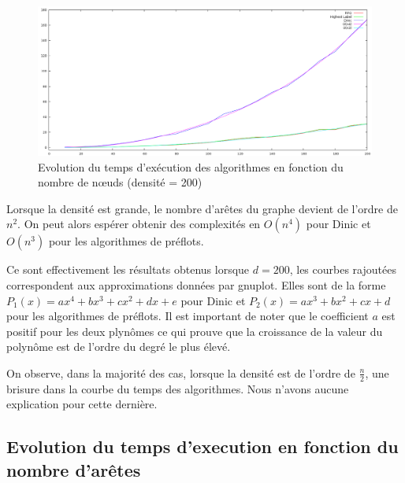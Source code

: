 \begin{figure}
\begin{center}
\includegraphics[scale=1.2]{../data_struct/results/ratio200b.png}
\end{center}
\caption{Evolution du temps d'exécution des algorithmes en fonction du nombre de n\oe uds (densité =
200)}
\label{d200}
\end{figure}

Lorsque la densité est grande, le nombre d'arêtes du graphe devient de l'ordre de $n^2$. On peut
alors espérer obtenir des complexités en $O(n^4)$ pour Dinic et $O(n^3)$ pour les algorithmes de
préflots.

Ce sont effectivement les résultats obtenus lorsque $d=200$, les courbes rajoutées correspondent aux
approximations données par gnuplot. Elles sont de la forme $P_1(x) = ax^4 + bx^3 +cx^2 +dx +e$ pour
Dinic et $P_2(x) = ax^3 + bx^2 + cx +d$ pour les algorithmes de préflots. Il est important de noter
que le coefficient $a$ est positif pour les deux plynômes ce qui prouve que la croissance de la
valeur du polynôme est de l'ordre du degré le plus élevé.

On observe, dans la majorité des cas, lorsque la densité est de l'ordre de $\frac{n}{2}$, une
brisure dans la courbe du temps des algorithmes. Nous n'avons aucune explication pour cette
dernière.

\subsection{Evolution du temps d'execution en fonction du nombre d'arêtes}



